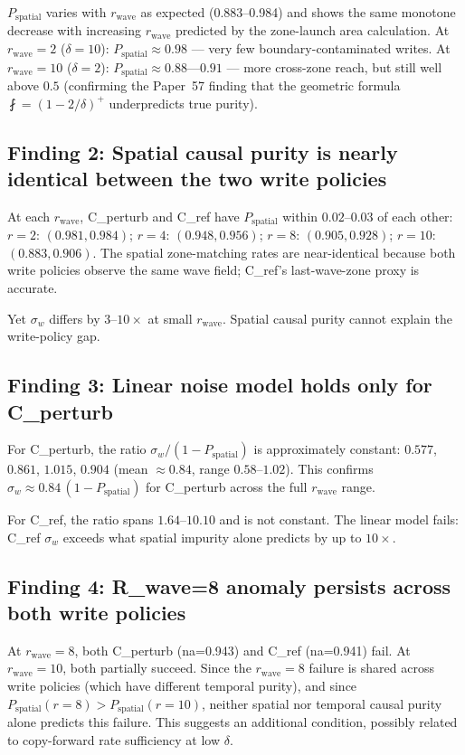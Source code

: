 \documentclass[11pt,a4paper]{article}
\newcommand{\Psp}{P_{\mathrm{spatial}}}
\begin{document}
$\Psp$ varies with $r_\mathrm{wave}$ as expected (0.883--0.984) and shows the same
monotone decrease with increasing $r_\mathrm{wave}$ predicted by the zone-launch area
calculation.
At $r_\mathrm{wave}=2$ ($\delta=10$): $\Psp \approx 0.98$ --- very few boundary-contaminated
writes.
At $r_\mathrm{wave}=10$ ($\delta=2$): $\Psp \approx 0.88$---$0.91$ --- more cross-zone reach,
but still well above $0.5$ (confirming the Paper~57 finding that the geometric formula
$\fint=(1-2/\delta)^+$ underpredicts true purity).

\subsection{Finding 2: Spatial causal purity is nearly identical between the two write policies}

At each $r_\mathrm{wave}$, C\_perturb and C\_ref have $\Psp$ within $0.02$--$0.03$ of each other:
$r=2$: $(0.981, 0.984)$; $r=4$: $(0.948, 0.956)$; $r=8$: $(0.905, 0.928)$; $r=10$: $(0.883, 0.906)$.
The spatial zone-matching rates are near-identical because both write policies observe the same
wave field; C\_ref's last-wave-zone proxy is accurate.

Yet $\sigma_w$ differs by $3$--$10\times$ at small $r_\mathrm{wave}$.
Spatial causal purity cannot explain the write-policy gap.

\subsection{Finding 3: Linear noise model holds only for C\_perturb}

For C\_perturb, the ratio $\sigma_w/(1-\Psp)$ is approximately constant:
$0.577$, $0.861$, $1.015$, $0.904$ (mean $\approx 0.84$, range $0.58$--$1.02$).
This confirms $\sigma_w \approx 0.84\,(1-\Psp)$ for C\_perturb across the full
$r_\mathrm{wave}$ range.

For C\_ref, the ratio spans $1.64$--$10.10$ and is not constant.
The linear model fails: C\_ref $\sigma_w$ exceeds what spatial impurity alone predicts
by up to $10\times$.

\subsection{Finding 4: R\_wave=8 anomaly persists across both write policies}

At $r_\mathrm{wave}=8$, both C\_perturb (na=0.943) and C\_ref (na=0.941) fail.
At $r_\mathrm{wave}=10$, both partially succeed.
Since the $r_\mathrm{wave}=8$ failure is shared across write policies (which have
different temporal purity), and since $\Psp(r=8) > \Psp(r=10)$, neither spatial
nor temporal causal purity alone predicts this failure.
This suggests an additional condition, possibly related to copy-forward rate
sufficiency at low $\delta$.
\end{document}
